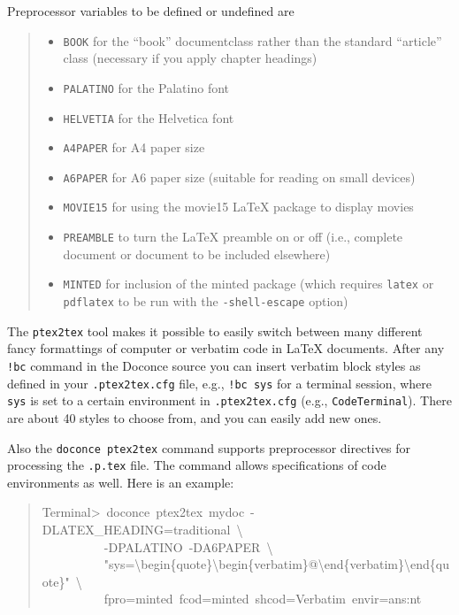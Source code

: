 \documentclass[a4paper]{article}
\begin{document}
Preprocessor variables to be defined or undefined are
%
\begin{quote}
%
\begin{itemize}

\item \texttt{BOOK} for the ``book'' documentclass rather than the standard
``article'' class (necessary if you apply chapter headings)

\item \texttt{PALATINO} for the Palatino font

\item \texttt{HELVETIA} for the Helvetica font

\item \texttt{A4PAPER} for A4 paper size

\item \texttt{A6PAPER} for A6 paper size (suitable for reading on small devices)

\item \texttt{MOVIE15} for using the movie15 LaTeX package to display movies

\item \texttt{PREAMBLE} to turn the LaTeX preamble on or off (i.e., complete document
or document to be included elsewhere)

\item \texttt{MINTED} for inclusion of the minted package (which requires \texttt{latex}
or \texttt{pdflatex} to be run with the \texttt{-shell-escape} option)

\end{itemize}

\end{quote}

The \texttt{ptex2tex} tool makes it possible to easily switch between many
different fancy formattings of computer or verbatim code in LaTeX
documents. After any \texttt{!bc} command in the Doconce source you can
insert verbatim block styles as defined in your \texttt{.ptex2tex.cfg}
file, e.g., \texttt{!bc sys} for a terminal session, where \texttt{sys} is set to
a certain environment in \texttt{.ptex2tex.cfg} (e.g., \texttt{CodeTerminal}).
There are about 40 styles to choose from, and you can easily add
new ones.

Also the \texttt{doconce ptex2tex} command supports preprocessor directives
for processing the \texttt{.p.tex} file. The command allows specifications
of code environments as well. Here is an example:
%
\begin{quote}{\ttfamily \raggedright \noindent
Terminal>~doconce~ptex2tex~mydoc~-DLATEX\_HEADING=traditional~\textbackslash{}\\
~~~~~~~~~~-DPALATINO~-DA6PAPER~\textbackslash{}\\
~~~~~~~~~~"sys=\textbackslash{}begin\{quote\}\textbackslash{}begin\{verbatim\}@\textbackslash{}end\{verbatim\}\textbackslash{}end\{quote\}"~\textbackslash{}\\
~~~~~~~~~~fpro=minted~fcod=minted~shcod=Verbatim~envir=ans:nt
}
\end{quote}
\end{document}
